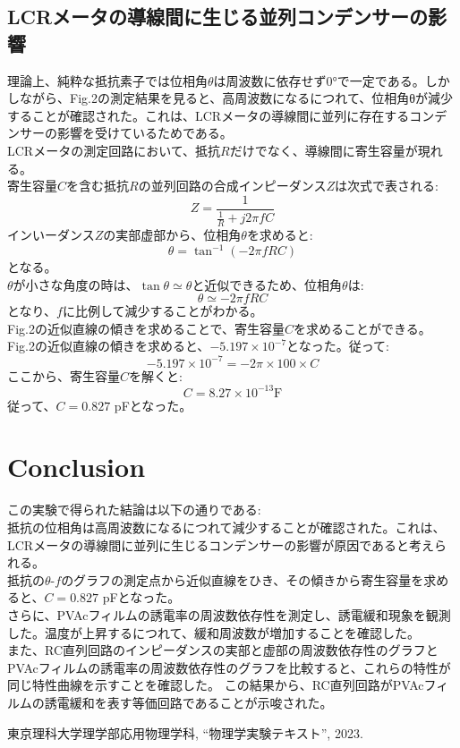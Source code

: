 \documentclass[a4paper,10pt]{jsarticle}
\begin{document}
\begin{multicols}{2}
\subsection{\textrm{LCRメータの導線間に生じる並列コンデンサーの影響}}
理論上、純粋な抵抗素子では位相角$\theta$は周波数に依存せず0°で一定である。しかしながら、Fig.2の測定結果を見ると、高周波数になるにつれて、位相角θが減少することが確認された。これは、LCRメータの導線間に並列に存在するコンデンサーの影響を受けているためである。\\
LCRメータの測定回路において、抵抗$R$だけでなく、導線間に寄生容量が現れる。\\
寄生容量$C$を含む抵抗$R$の並列回路の合成インピーダンス$Z$は次式で表される:
\begin{equation}
  Z = \frac{1}{\frac{1}{R}+j2\pi fC}
\end{equation}
インいーダンス$Z$の実部虚部から、位相角$\theta$を求めると:
\begin{equation}
 {\theta} = \tan^{-1} (-2\pi fRC)
\end{equation}
となる。\\
$\theta$が小さな角度の時は、$\tan{\theta} \simeq \theta$と近似できるため、位相角$\theta$は:
\begin{equation}
  \theta \simeq -2\pi fRC
\end{equation}
となり、$f$に比例して減少することがわかる。\\
Fig.2の近似直線の傾きを求めることで、寄生容量$C$を求めることができる。\\
Fig.2の近似直線の傾きを求めると、$-5.197\times 10^{-7}$となった。従って:
\begin{equation}
  -5.197\times 10^{-7} = -2\pi \times 100 \times C
\end{equation}
ここから、寄生容量$C$を解くと:
\begin{equation}
  C = 8.27 \times 10^{-13} \text{F}
\end{equation}
従って、$C = 0.827$ pFとなった。\\

\section{\textrm{Conclusion}}
この実験で得られた結論は以下の通りである:\\
抵抗の位相角は高周波数になるにつれて減少することが確認された。これは、LCRメータの導線間に並列に生じるコンデンサーの影響が原因であると考えられる。\\
抵抗の$\theta$-$f$のグラフの測定点から近似直線をひき、その傾きから寄生容量を求めると、$C=0.827$ pFとなった。\\
さらに、PVAcフィルムの誘電率の周波数依存性を測定し、誘電緩和現象を観測した。温度が上昇するにつれて、緩和周波数が増加することを確認した。\\
また、RC直列回路のインピーダンスの実部と虚部の周波数依存性のグラフとPVAcフィルムの誘電率の周波数依存性のグラフを比較すると、これらの特性が同じ特性曲線を示すことを確認した。
この結果から、RC直列回路がPVAcフィルムの誘電緩和を表す等価回路であることが示唆された。
\begin{thebibliography}{文献数}
   東京理科大学理学部応用物理学科, ``物理学実験テキスト'', 2023.
  \end{thebibliography}
\clearpage

\end{multicols}
\end{document}
